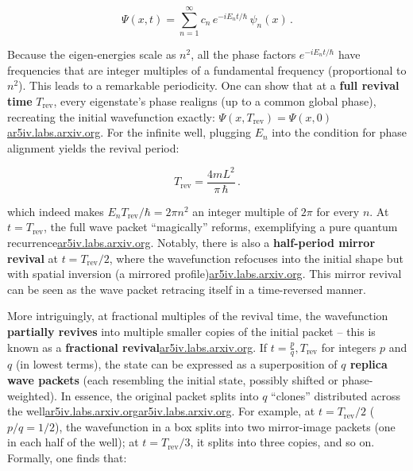 \documentclass[11pt,a4paper]{article}
\begin{document}
\begin{equation}
\Psi(x,t) = \sum_{n=1}^{\infty} c_n\, e^{-i E_n t/\hbar}\, \psi_n(x)\,. \tag{1}
\end{equation}

Because the eigen-energies scale as $n^2$, all the phase factors $e^{-iE_n t/\hbar}$ have frequencies that are integer multiples of a fundamental frequency (proportional to $n^2$). This leads to a remarkable periodicity. One can show that at a \textbf{full revival time} $T_{\text{rev}}$, every eigenstate’s phase realigns (up to a common global phase), recreating the initial wavefunction exactly: $\Psi(x,T_{\text{rev}})=\Psi(x,0)$\href{https://ar5iv.labs.arxiv.org/html/1808.09708#:~:text=which means that after the,period with}{ar5iv.labs.arxiv.org}. For the infinite well, plugging $E_n$ into the condition for phase alignment yields the revival period:

\begin{equation}
T_{\text{rev}} = \frac{4 m L^2}{\pi\,\hbar}\,.\tag{2}
\end{equation}

which indeed makes $E_n T_{\text{rev}}/\hbar = 2\pi n^2$ an integer multiple of $2\pi$ for every $n$. At $t=T_{\text{rev}}$, the full wave packet “magically” reforms, exemplifying a pure quantum recurrence\href{https://ar5iv.labs.arxiv.org/html/1808.09708#:~:text=“quantum carpet”%2C which was introduced,( 25}{ar5iv.labs.arxiv.org}. Notably, there is also a \textbf{half-period mirror revival} at $t=T_{\text{rev}}/2$, where the wavefunction refocuses into the initial shape but with spatial inversion (a mirrored profile)\href{https://ar5iv.labs.arxiv.org/html/1808.09708#:~:text=Besides full revival%2C there is,( 48}{ar5iv.labs.arxiv.org}. This mirror revival can be seen as the wave packet retracing itself in a time-reversed manner.

More intriguingly, at fractional multiples of the revival time, the wavefunction \textbf{partially revives} into multiple smaller copies of the initial packet – this is known as a \textbf{fractional revival}\href{https://ar5iv.labs.arxiv.org/html/1808.09708#:~:text=Apart from the full revival,Different}{ar5iv.labs.arxiv.org}. If $t = \frac{p}{q},T_{\text{rev}}$ for integers $p$ and $q$ (in lowest terms), the state can be expressed as a superposition of \textbf{$q$ replica wave packets} (each resembling the initial state, possibly shifted or phase-weighted). In essence, the original packet splits into $q$ “clones” distributed across the well\href{https://ar5iv.labs.arxiv.org/html/1808.09708#:~:text=Apart from the full revival,Different}{ar5iv.labs.arxiv.org}\href{https://ar5iv.labs.arxiv.org/html/1808.09708#:~:text=Apart from the full revival,shall see%2C the wave function}{ar5iv.labs.arxiv.org}. For example, at $t=T_{\text{rev}}/2$ ($p/q=1/2$), the wavefunction in a box splits into two mirror-image packets (one in each half of the well); at $t=T_{\text{rev}}/3$, it splits into three copies, and so on. Formally, one finds that:
\end{document}
